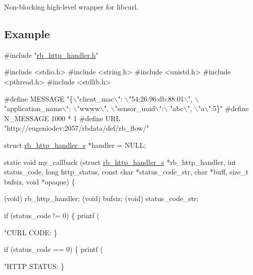 Non-\/blocking high-\/level wrapper for libcurl.

\subsection*{Example}


\begin{DoxyCode}
\textcolor{preprocessor}{#include "\hyperlink{rb__http__handler_8h}{rb\_http\_handler.h}"}

\textcolor{preprocessor}{#include <stdio.h>}
\textcolor{preprocessor}{#include <string.h>}
\textcolor{preprocessor}{#include <unistd.h>}
\textcolor{preprocessor}{#include <pthread.h>}
\textcolor{preprocessor}{#include <stdlib.h>}

\textcolor{preprocessor}{#define MESSAGE "\{\(\backslash\)"client\_mac\(\backslash\)": \(\backslash\)"54:26:96:db:88:01\(\backslash\)", \(\backslash\)"application\_name\(\backslash\)": \(\backslash\)"wwww\(\backslash\)", \(\backslash\)"sensor\_uuid\(\backslash\)":\(\backslash\)
      "abc\(\backslash\)", \(\backslash\)"a\(\backslash\)":5\}"}
\textcolor{preprocessor}{#define N\_MESSAGE 1000 * 1}
\textcolor{preprocessor}{#define URL "http://eugeniodev:2057/rbdata/def/rb\_flow/"}

\textcolor{keyword}{struct }\hyperlink{structrb__http__handler__s}{rb\_http\_handler\_s} *handler = NULL;

\textcolor{keyword}{static} \textcolor{keywordtype}{void} my\_callback (\textcolor{keyword}{struct} \hyperlink{structrb__http__handler__s}{rb\_http\_handler\_s} *rb\_http\_handler,
                         \textcolor{keywordtype}{int} status\_code,
                         \textcolor{keywordtype}{long} http\_status,
                         \textcolor{keyword}{const} \textcolor{keywordtype}{char} *status\_code\_str,
                         \textcolor{keywordtype}{char} *buff,
                         \textcolor{keywordtype}{size\_t} bufsiz,
                         \textcolor{keywordtype}{void} *opaque) \{

    (void) rb\_http\_handler;
    (void) bufsiz;
    (void) status\_code\_str;

    \textcolor{keywordflow}{if} (status\_code != 0) \{
        printf (\textcolor{stringliteral}{"CURL CODE: %
    \}

    \textcolor{keywordflow}{if} (status\_code == 0) \{
        printf (\textcolor{stringliteral}{"HTTP STATUS: %
    \}

}}
\end{DoxyCode}

